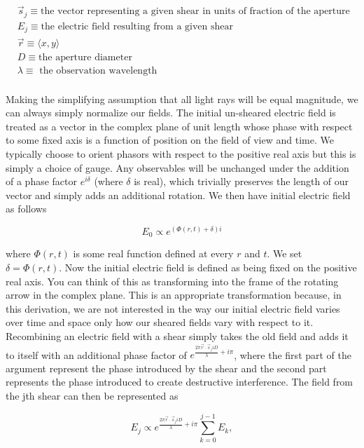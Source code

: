 \documentclass{article}
\begin{document}
	\begin{align*}
	&\vec{s}_j \equiv \mbox{the vector representing a given shear in units of fraction of the aperture radius}\\
	&E_j \equiv \mbox{the electric field resulting from a given shear}\\
	&\vec{r} \equiv \langle x, y \rangle \\
	&D \equiv \mbox{the aperture diameter} \\
	&\lambda \equiv \mbox{ the observation wavelength}\\ 
	\end{align*}
	
	Making the simplifying assumption that all light rays will be equal magnitude, we can always simply normalize our fields. The initial un-sheared electric field is treated as a vector in the complex plane of unit length whose phase with respect to some fixed axis is a function of position on the field of view and time. We typically choose to orient phasors with respect to the positive real axis but this is simply a choice of gauge. Any observables will be unchanged under the addition of a phase factor $e^{i \delta}$ (where $\delta$ is real), which trivially preserves the length of our vector and simply adds an additional rotation. We then have initial electric field as follows
	
	\begin{equation}
	E_0 \propto e^{\left( \Phi(r,t) + \delta\right) i}
	\end{equation}
	
where $\Phi(r,t)$ is some real function defined at every $r$ and $t$. We set $\delta = \Phi(r,t)$. Now the initial electric field is defined as being fixed on the positive real axis. You can think of this as transforming into the frame of the rotating arrow in the complex plane. This is an appropriate transformation because, in this derivation, we are not interested in the way our initial electric field varies over time and space only how our sheared fields vary with respect to it.
	Recombining an electric field with a shear simply takes the old field and adds it to itself with an additional phase factor of $e^{\frac{2 \pi \vec{r} \cdot\vec{s}_j i D}{\lambda} + i \pi}$, where the first part of the argument represent the phase introduced by the shear and the second part represents the phase introduced to create destructive interference. The field from the jth shear can then be represented as 
	
	\begin{equation}
	E_j \propto e^{\frac{2 \pi \vec{r} \cdot\vec{s}_j i D}{\lambda} + i \pi} \sum_{k = 0}^{j-1} E_k,
	\end{equation}
	
\end{document}
